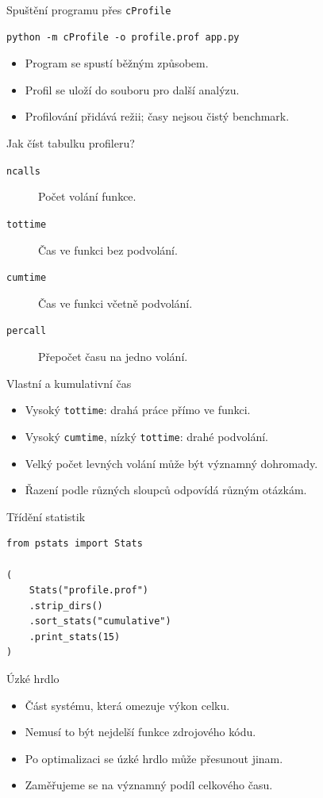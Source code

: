 \documentclass[aspectratio=169]{beamer}
\begin{document}
\begin{frame}[fragile]{Spuštění programu přes \texttt{cProfile}}
\begin{lstlisting}[basicstyle=\ttfamily\large]
python -m cProfile -o profile.prof app.py
\end{lstlisting}
\begin{itemize}
\item Program se spustí běžným způsobem.
\item Profil se uloží do souboru pro další analýzu.
\item Profilování přidává režii; časy nejsou čistý benchmark.
\end{itemize}
\end{frame}

\begin{frame}{Jak číst tabulku profileru?}
\begin{description}
\item[\texttt{ncalls}] Počet volání funkce.
\item[\texttt{tottime}] Čas ve funkci bez podvolání.
\item[\texttt{cumtime}] Čas ve funkci včetně podvolání.
\item[\texttt{percall}] Přepočet času na jedno volání.
\end{description}
\end{frame}

\begin{frame}{Vlastní a kumulativní čas}
\begin{itemize}
\item Vysoký \texttt{tottime}: drahá práce přímo ve funkci.
\item Vysoký \texttt{cumtime}, nízký \texttt{tottime}: drahé podvolání.
\item Velký počet levných volání může být významný dohromady.
\item Řazení podle různých sloupců odpovídá různým otázkám.
\end{itemize}
\end{frame}

\begin{frame}[fragile]{Třídění statistik}
\begin{lstlisting}[style=python]
from pstats import Stats

(
    Stats("profile.prof")
    .strip_dirs()
    .sort_stats("cumulative")
    .print_stats(15)
)
\end{lstlisting}
\end{frame}

\begin{frame}{Úzké hrdlo}
\begin{itemize}
\item Část systému, která omezuje výkon celku.
\item Nemusí to být nejdelší funkce zdrojového kódu.
\item Po optimalizaci se úzké hrdlo může přesunout jinam.
\item Zaměřujeme se na významný podíl celkového času.
\end{itemize}
\end{frame}
\end{document}
